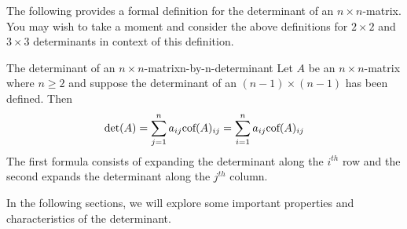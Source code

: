 The following provides a formal definition for the determinant of an
$n\times n$-matrix. You may wish to take a moment and consider the
above definitions for $2\times 2$ and $3\times 3$ determinants in
context of this definition.

\begin{definition}{The determinant of an $n\times n$-matrix}{n-by-n-determinant}
  Let $A$ be an $n\times n$-matrix where $n\geq 2$ and suppose the
  determinant of an $(n-1)\times (n-1) $ has been defined. Then
  \begin{equation*}
    \det(A) =\sum_{j=1}^{n}a_{ij}\mbox{\rm cof}(A)
    _{ij}=\sum_{i=1}^{n}a_{ij}\mbox{\rm cof}(A) _{ij}
  \end{equation*}
  The first formula consists of expanding the determinant along the
  $i^{th}$ row and the second expands the determinant along the
  $j^{th}$ column.
\end{definition}

In the following sections, we will explore some important properties
and characteristics of the determinant.
